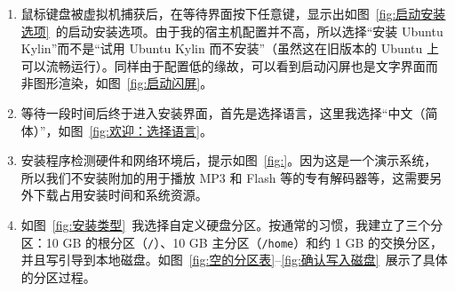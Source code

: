 \documentclass[cs4size,a4paper,nofonts]{ctexart}
\begin{document}
\begin{enumerate}
\begin{figure}[htp]
\end{figure}

\begin{figure}[htp]
\end{figure}

\item 鼠标键盘被虚拟机捕获后，在等待界面按下任意键，显示出如图~\ref{fig:启动安装选项}~的启动安装选项。由于我的宿主机配置并不高，所以选择“安装 Ubuntu Kylin”而不是“试用 Ubuntu Kylin 而不安装”（虽然这在旧版本的 Ubuntu 上可以流畅运行）。同样由于配置低的缘故，可以看到启动闪屏也是文字界面而非图形渲染，如图~\ref{fig:启动闪屏}。

\begin{figure}[htp]
\end{figure}

\item 等待一段时间后终于进入安装界面，首先是选择语言，这里我选择“中文（简体）”，如图~\ref{fig:欢迎：选择语言}。

\item 安装程序检测硬件和网络环境后，提示如图~\ref{fig:}。因为这是一个演示系统，所以我们不安装附加的用于播放 MP3 和 Flash 等的专有解码器等，这需要另外下载占用安装时间和系统资源。

\begin{figure}[htp]
\end{figure}

\item 如图~\ref{fig:安装类型}~我选择自定义硬盘分区。按通常的习惯，我建立了三个分区：10 GB 的根分区（\verb|/|）、10 GB 主分区（\verb|/home|）和约 1 GB 的交换分区，并且写引导到本地磁盘。如图~\ref{fig:空的分区表}--\ref{fig:确认写入磁盘}~展示了具体的分区过程。

\begin{figure}[htp]
\end{figure}

\begin{figure}[htp]
\end{figure}


\end{enumerate}
\end{document}
